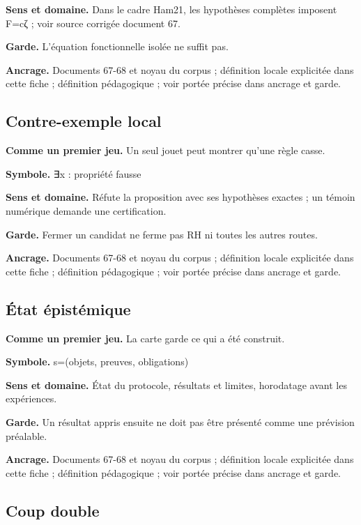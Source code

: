 \documentclass[
  9pt,
  a4paper,
]{article}
\begin{document}
\textbf{Sens et domaine.} Dans le cadre Ham21, les hypothèses complètes
imposent F=cζ ; voir source corrigée document 67.

\textbf{Garde.} L'équation fonctionnelle isolée ne suffit pas.

\textbf{Ancrage.} Documents 67-68 et noyau du corpus ; définition locale
explicitée dans cette fiche ; définition pédagogique ; voir portée
précise dans ancrage et garde.

\hypertarget{contre-exemple-local}{%
\subsection{Contre-exemple local}\label{contre-exemple-local}}

\textbf{Comme un premier jeu.} Un seul jouet peut montrer qu'une règle
casse.

\textbf{Symbole.} ∃x : propriété fausse

\textbf{Sens et domaine.} Réfute la proposition avec ses hypothèses
exactes ; un témoin numérique demande une certification.

\textbf{Garde.} Fermer un candidat ne ferme pas RH ni toutes les autres
routes.

\textbf{Ancrage.} Documents 67-68 et noyau du corpus ; définition locale
explicitée dans cette fiche ; définition pédagogique ; voir portée
précise dans ancrage et garde.

\hypertarget{uxe9tat-uxe9pistuxe9mique}{%
\subsection{État épistémique}\label{uxe9tat-uxe9pistuxe9mique}}

\textbf{Comme un premier jeu.} La carte garde ce qui a été construit.

\textbf{Symbole.} s=(objets, preuves, obligations)

\textbf{Sens et domaine.} État du protocole, résultats et limites,
horodatage avant les expériences.

\textbf{Garde.} Un résultat appris ensuite ne doit pas être présenté
comme une prévision préalable.

\textbf{Ancrage.} Documents 67-68 et noyau du corpus ; définition locale
explicitée dans cette fiche ; définition pédagogique ; voir portée
précise dans ancrage et garde.

\hypertarget{coup-double}{%
\subsection{Coup double}\label{coup-double}}
\end{document}
